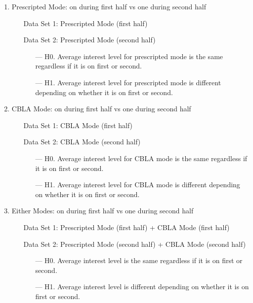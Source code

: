 \begin{enumerate}
	\item Prescripted Mode: on during first half vs one during second half \label{itm:interest-wtest-first}
		\begin{itemize}[align=left]
			\item[Data Set 1: ] Prescripted Mode (first half)
			\item[Data Set 2: ] Prescripted Mode (second half)
			\begin{itemize}
				\item[--- H0.] Average interest level for prescripted mode is the same regardless if it is on first or second.
				\item[--- H1.] Average interest level for prescripted mode is different depending on whether it is on first or second.
			\end{itemize}
		\end{itemize}
	\item CBLA Mode: on during first half vs one during second half
		\begin{itemize}[align=left]
			\item[Data Set 1: ] CBLA Mode (first half)
			\item[Data Set 2: ] CBLA Mode (second half)
			\begin{itemize}
				\item[--- H0.] Average interest level for CBLA mode is the same regardless if it is on first or second.
				\item[--- H1.] Average interest level for CBLA mode is different depending on whether it is on first or second.			
			\end{itemize}
		\end{itemize}
	\item Either Modes: on during first half vs one during second half
		\begin{itemize}[align=left]
			\item[Data Set 1: ] Prescripted Mode (first half) + CBLA Mode (first half)
			\item[Data Set 2: ] Prescripted Mode (second half) + CBLA Mode (second half)
			\begin{itemize}
				\item[--- H0.] Average interest level is the same regardless if it is on first or second.
				\item[--- H1.] Average interest level is different depending on whether it is on first or second.
			\end{itemize}
		\end{itemize}

\end{enumerate}
